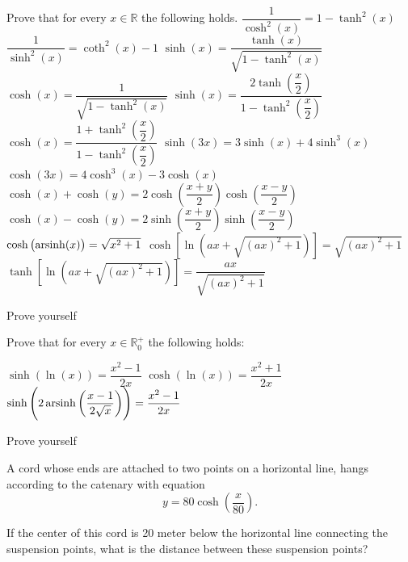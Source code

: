 \begin{Exercise} Prove that for every $x \in \mathbb{R}$ the following holds.
    \Question[difficulty = 1] $\dfrac{1}{\cosh^2(x)}=1-\tanh^2(x)$
    \Question[difficulty = 1] $\dfrac{1}{\sinh^2(x)}=\coth^2(x)-1$
    \Question[difficulty = 1] $\sinh (x)=\dfrac{\tanh (x)}{\sqrt{1-\tanh^2(x)}}$
    \Question[difficulty = 2] $\cosh (x)=\dfrac{1}{\sqrt{1-\tanh^2(x)}}$
    \Question[difficulty = 2] $\sinh (x)=\dfrac{2\tanh \left(\dfrac{x}{2} \right)}{1-\tanh^2 \left(\dfrac{x}{2}\right)}$
    \Question[difficulty = 1] $\cosh (x)=\dfrac{1+\tanh^2\left(\dfrac{x}{2} \right)}{1-\tanh ^2\left(\dfrac{x}{2} \right)}$
    \Question[difficulty = 1] $\sinh (3x)=3\sinh (x)+4\sinh^3(x)$
    \Question[difficulty = 1] $\cosh (3x)=4\cosh^3(x)-3\cosh (x)$
    \Question[difficulty = 1] $\cosh (x)+\cosh (y)=2\cosh \left(\dfrac{x+y}{2} \right) \cosh \left(\dfrac{x-y}{2} \right)$
    \Question[difficulty = 1] $\cosh (x)-\cosh (y)=2\sinh \left(\dfrac{x+y}{2} \right) \sinh \left(\dfrac{x-y}{2} \right)$
    \Question[difficulty = 1] $\cosh \left(\operatorname{arsinh} (x) \right)=\sqrt{x^2+1}$
    \Question[difficulty = 2] $\cosh \left[\ln\left(ax+\sqrt{(ax)^2+1}\right)\right]=\sqrt{(ax)^2+1}$
    \Question[difficulty = 2] $\tanh \left[\ln\left(ax+\sqrt{(ax)^2+1}\right)\right]=\dfrac{ax}{\sqrt{(ax)^2+1}}$ 

\end{Exercise}

\begin{Answer}\phantom{}
 Prove yourself
\end{Answer}


\begin{Exercise} Prove that for every $x \in \mathbb{R}^+_0$ the following holds:
\begin{multicols}{2}
    \Question[difficulty = 1] $\sinh (\ln (x))=\dfrac{x^2-1}{2x}$
    \Question[difficulty = 1] $\cosh (\ln (x))=\dfrac{x^2+1}{2x}$
    \Question[difficulty = 2] $\sinh \left(2\operatorname{arsinh} \left(\dfrac{x-1}{2\sqrt{x}} \right)\right) = \dfrac{x^2-1}{2x}$
    \EndCurrentQuestion
\end{multicols}

\end{Exercise}

\begin{Answer}\phantom{}
   Prove  yourself
\end{Answer}

\begin{Exercise}[difficulty = 1] A cord whose ends are attached to two points on a horizontal line, hangs according to the catenary with equation
\[ y=80 \cosh \left(\dfrac{x}{80}\right). \]

If the center of this cord is 20 meter below the horizontal line  connecting the suspension points, what is the distance between these suspension points?

\end{Exercise}

